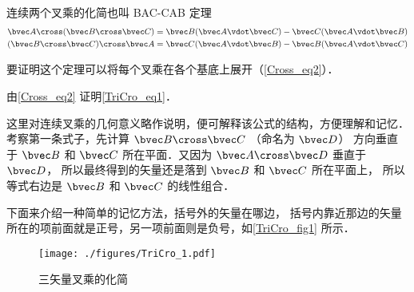 

连续两个叉乘的化简也叫 BAC-CAB 定理
\begin{gather}
\bvec A \cross (\bvec B \cross \bvec C) = \bvec B (\bvec A \vdot \bvec C) - \bvec C (\bvec A \vdot \bvec B)\label{TriCro_eq1}\\
(\bvec B \cross \bvec C) \cross \bvec A = \bvec C (\bvec A \vdot \bvec B) - \bvec B (\bvec A \vdot \bvec C)
\end{gather}

要证明这个定理可以将每个叉乘在各个基底上展开（\autoref{Cross_eq2}）．

\begin{exercise}{}
由\autoref{Cross_eq2} 证明\autoref{TriCro_eq1}．
\end{exercise} 

这里对连续叉乘的几何意义略作说明，便可解释该公式的结构，方便理解和记忆．考察第一条式子，先计算 $\bvec B \cross \bvec C$ （命名为 $\bvec D$） 方向垂直于 $\bvec B$ 和 $\bvec C$ 所在平面．又因为 $\bvec A \cross \bvec D$ 垂直于 $\bvec D$， 所以最终得到的矢量还是落到 $\bvec B$ 和 $\bvec C$ 所在平面上， 所以等式右边是 $\bvec B$ 和 $\bvec C$ 的线性组合．

下面来介绍一种简单的记忆方法，括号外的矢量在哪边， 括号内靠近那边的矢量所在的项前面就是正号，另一项前面则是负号，如\autoref{TriCro_fig1} 所示．

\begin{figure}[ht]
\centering
\texttt{[image: ./figures/TriCro\_1.pdf]}
\caption{三矢量叉乘的化简}\label{TriCro_fig1}
\end{figure}